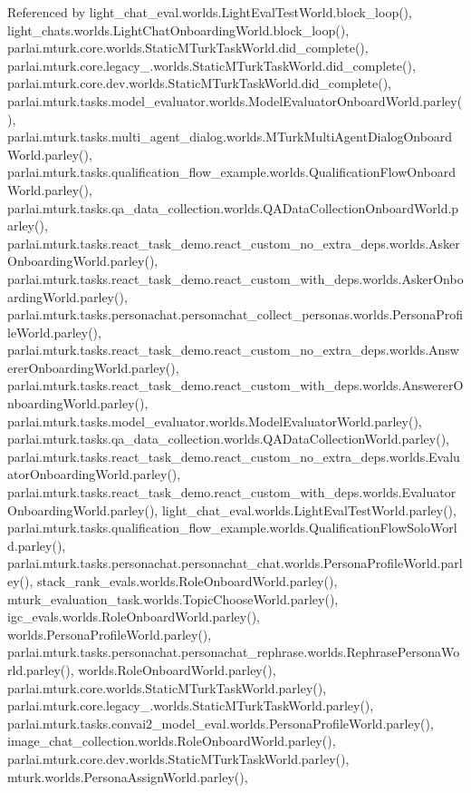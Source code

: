 Referenced by light\+\_\+chat\+\_\+eval.\+worlds.\+Light\+Eval\+Test\+World.\+block\+\_\+loop(), light\+\_\+chats.\+worlds.\+Light\+Chat\+Onboarding\+World.\+block\+\_\+loop(), parlai.\+mturk.\+core.\+worlds.\+Static\+M\+Turk\+Task\+World.\+did\+\_\+complete(), parlai.\+mturk.\+core.\+legacy\+\_.\+worlds.\+Static\+M\+Turk\+Task\+World.\+did\+\_\+complete(), parlai.\+mturk.\+core.\+dev.\+worlds.\+Static\+M\+Turk\+Task\+World.\+did\+\_\+complete(), parlai.\+mturk.\+tasks.\+model\+\_\+evaluator.\+worlds.\+Model\+Evaluator\+Onboard\+World.\+parley(), parlai.\+mturk.\+tasks.\+multi\+\_\+agent\+\_\+dialog.\+worlds.\+M\+Turk\+Multi\+Agent\+Dialog\+Onboard\+World.\+parley(), parlai.\+mturk.\+tasks.\+qualification\+\_\+flow\+\_\+example.\+worlds.\+Qualification\+Flow\+Onboard\+World.\+parley(), parlai.\+mturk.\+tasks.\+qa\+\_\+data\+\_\+collection.\+worlds.\+Q\+A\+Data\+Collection\+Onboard\+World.\+parley(), parlai.\+mturk.\+tasks.\+react\+\_\+task\+\_\+demo.\+react\+\_\+custom\+\_\+no\+\_\+extra\+\_\+deps.\+worlds.\+Asker\+Onboarding\+World.\+parley(), parlai.\+mturk.\+tasks.\+react\+\_\+task\+\_\+demo.\+react\+\_\+custom\+\_\+with\+\_\+deps.\+worlds.\+Asker\+Onboarding\+World.\+parley(), parlai.\+mturk.\+tasks.\+personachat.\+personachat\+\_\+collect\+\_\+personas.\+worlds.\+Persona\+Profile\+World.\+parley(), parlai.\+mturk.\+tasks.\+react\+\_\+task\+\_\+demo.\+react\+\_\+custom\+\_\+no\+\_\+extra\+\_\+deps.\+worlds.\+Answerer\+Onboarding\+World.\+parley(), parlai.\+mturk.\+tasks.\+react\+\_\+task\+\_\+demo.\+react\+\_\+custom\+\_\+with\+\_\+deps.\+worlds.\+Answerer\+Onboarding\+World.\+parley(), parlai.\+mturk.\+tasks.\+model\+\_\+evaluator.\+worlds.\+Model\+Evaluator\+World.\+parley(), parlai.\+mturk.\+tasks.\+qa\+\_\+data\+\_\+collection.\+worlds.\+Q\+A\+Data\+Collection\+World.\+parley(), parlai.\+mturk.\+tasks.\+react\+\_\+task\+\_\+demo.\+react\+\_\+custom\+\_\+no\+\_\+extra\+\_\+deps.\+worlds.\+Evaluator\+Onboarding\+World.\+parley(), parlai.\+mturk.\+tasks.\+react\+\_\+task\+\_\+demo.\+react\+\_\+custom\+\_\+with\+\_\+deps.\+worlds.\+Evaluator\+Onboarding\+World.\+parley(), light\+\_\+chat\+\_\+eval.\+worlds.\+Light\+Eval\+Test\+World.\+parley(), parlai.\+mturk.\+tasks.\+qualification\+\_\+flow\+\_\+example.\+worlds.\+Qualification\+Flow\+Solo\+World.\+parley(), parlai.\+mturk.\+tasks.\+personachat.\+personachat\+\_\+chat.\+worlds.\+Persona\+Profile\+World.\+parley(), stack\+\_\+rank\+\_\+evals.\+worlds.\+Role\+Onboard\+World.\+parley(), mturk\+\_\+evaluation\+\_\+task.\+worlds.\+Topic\+Choose\+World.\+parley(), igc\+\_\+evals.\+worlds.\+Role\+Onboard\+World.\+parley(), worlds.\+Persona\+Profile\+World.\+parley(), parlai.\+mturk.\+tasks.\+personachat.\+personachat\+\_\+rephrase.\+worlds.\+Rephrase\+Persona\+World.\+parley(), worlds.\+Role\+Onboard\+World.\+parley(), parlai.\+mturk.\+core.\+worlds.\+Static\+M\+Turk\+Task\+World.\+parley(), parlai.\+mturk.\+core.\+legacy\+\_.\+worlds.\+Static\+M\+Turk\+Task\+World.\+parley(), parlai.\+mturk.\+tasks.\+convai2\+\_\+model\+\_\+eval.\+worlds.\+Persona\+Profile\+World.\+parley(), image\+\_\+chat\+\_\+collection.\+worlds.\+Role\+Onboard\+World.\+parley(), parlai.\+mturk.\+core.\+dev.\+worlds.\+Static\+M\+Turk\+Task\+World.\+parley(), mturk.\+worlds.\+Persona\+Assign\+World.\+parley(), 